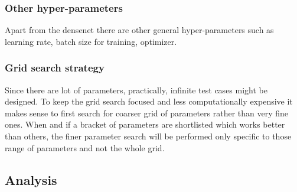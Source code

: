 \subsubsection{Other hyper-parameters}
Apart from the densenet there are other general hyper-parameters such as learning rate, batch size for training, optimizer. 


\subsubsection{Grid search strategy}
Since there are lot of parameters, practically, infinite test cases might be designed. To keep the grid search focused and less computationally expensive it makes sense to 
first search for coarser grid of parameters rather than very fine ones. When and if a bracket of parameters are shortlisted which works better than others, the finer parameter
search will be performed only specific to those range of parameters and not the whole grid.

\subsection{Analysis}

